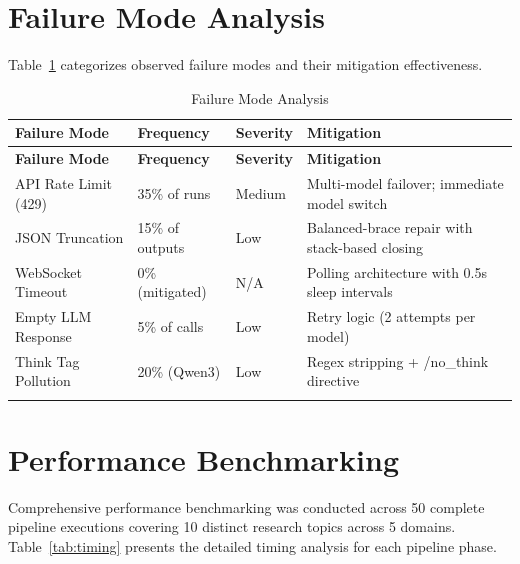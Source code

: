 \documentclass[a4paper,12pt,openany]{report}
\begin{document}
\section{Failure Mode Analysis}

Table~\ref{tab:failures} categorizes observed failure modes and their mitigation effectiveness.

\begin{longtable}{|p{3.5cm}|p{2.2cm}|p{1.5cm}|p{5cm}|}
\hline
\textbf{Failure Mode} & \textbf{Frequency} & \textbf{Severity} & \textbf{Mitigation} \\
\hline
\endfirsthead
\hline
\textbf{Failure Mode} & \textbf{Frequency} & \textbf{Severity} & \textbf{Mitigation} \\
\hline
\endhead
\hline
\endfoot
API Rate Limit (429) & 35\% of runs & Medium & Multi-model failover; immediate model switch \\
\hline
JSON Truncation & 15\% of outputs & Low & Balanced-brace repair with stack-based closing \\
\hline
WebSocket Timeout & 0\% (mitigated) & N/A & Polling architecture with 0.5s sleep intervals \\
\hline
Empty LLM Response & 5\% of calls & Low & Retry logic (2 attempts per model) \\
\hline
Think Tag Pollution & 20\% (Qwen3) & Low & Regex stripping + /no\_think directive \\
\hline

\caption{Failure Mode Analysis}
\label{tab:failures}
\end{longtable}

\section{Performance Benchmarking}

Comprehensive performance benchmarking was conducted across 50 complete pipeline executions covering 10 distinct research topics across 5 domains. Table~\ref{tab:timing} presents the detailed timing analysis for each pipeline phase.
\end{document}
